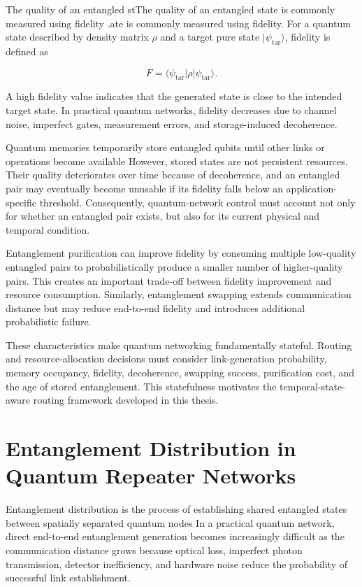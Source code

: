The quality of an entangled stThe quality of an entangled state is commonly measured using fidelity \cite{briegel1998quantum,halder2024optimal}.ate is commonly measured using fidelity. For a quantum state described by density matrix $\rho$ and a target pure state $|\psi_{\mathrm{tar}}\rangle$, fidelity is defined as

\begin{equation}
    F =
    \langle
    \psi_{\mathrm{tar}}
    |
    \rho
    |
    \psi_{\mathrm{tar}}
    \rangle.
\end{equation}

A high fidelity value indicates that the generated state is close to the intended target state. In practical quantum networks, fidelity decreases due to channel noise, imperfect gates, measurement errors, and storage-induced decoherence.

Quantum memories temporarily store entangled qubits until other links or operations become available \cite{vanmeter2014quantum,wehner2018vision} However, stored states are not persistent resources. Their quality deteriorates over time because of decoherence, and an entangled pair may eventually become unusable if its fidelity falls below an application-specific threshold. Consequently, quantum-network control must account not only for whether an entangled pair exists, but also for its current physical and temporal condition.

Entanglement purification can improve fidelity by consuming multiple low-quality entangled pairs to probabilistically produce a smaller number of higher-quality pairs. This creates an important trade-off between fidelity improvement and resource consumption. Similarly, entanglement swapping extends communication distance but may reduce end-to-end fidelity and introduces additional probabilistic failure.

These characteristics make quantum networking fundamentally stateful. Routing and resource-allocation decisions must consider link-generation probability, memory occupancy, fidelity, decoherence, swapping success, purification cost, and the age of stored entanglement. This statefulness motivates the temporal-state-aware routing framework developed in this thesis.
\section{Entanglement Distribution in Quantum Repeater Networks}
Entanglement distribution is the process of establishing shared entangled states between spatially separated quantum nodes \cite{briegel1998quantum,wehner2018vision} In a practical quantum network, direct end-to-end entanglement generation becomes increasingly difficult as the communication distance grows because optical loss, imperfect photon transmission, detector inefficiency, and hardware noise reduce the probability of successful link establishment.

